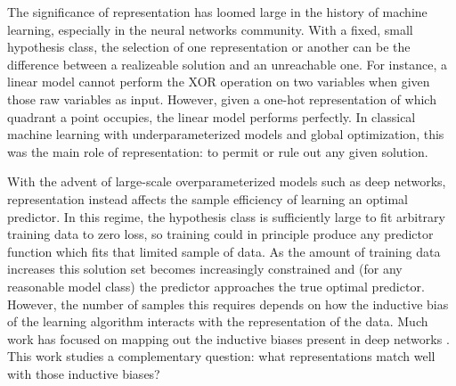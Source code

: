 The significance of representation has loomed large in the history of machine learning, especially in the neural networks community.
With a fixed, small hypothesis class, the selection of one representation or another can be the difference between a realizeable solution and an unreachable one.
For instance, a linear model cannot perform the XOR operation on two variables when given those raw variables as input.
However, given a one-hot representation of which quadrant a point occupies, the linear model performs perfectly.
In classical machine learning with underparameterized models and global optimization, this was the main role of representation: to permit or rule out any given solution.

With the advent of large-scale overparameterized models such as deep networks, representation instead affects the sample efficiency of learning an optimal predictor.
In this regime, the hypothesis class is sufficiently large to fit arbitrary training data to zero loss, so training could in principle produce any predictor function which fits that limited sample of data.
As the amount of training data increases this solution set becomes increasingly constrained and (for any reasonable model class) the predictor approaches the true optimal predictor.
However, the number of samples this requires depends on how the inductive bias of the learning algorithm interacts with the representation of the data.
Much work has focused on mapping out the inductive biases present in deep networks \citep{soudry2018,Ulyanov2018DeepIP,rahaman2019spectral,vallepérez2019deep,Shah2020ThePO}.
This work studies a complementary question: what representations match well with those inductive biases?






